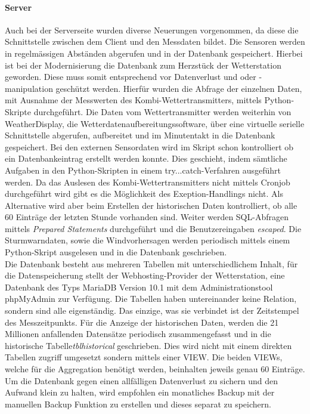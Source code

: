\documentclass[10pt]{article}
\begin{document}
\begin{multicols}{2}
\paragraph{Server}
Auch bei der  Serverseite wurden diverse Neuerungen vorgenommen, da diese die Schnittstelle zwischen dem Client und den Messdaten bildet. Die Sensoren werden in regelmässigen Abständen abgerufen und in der Datenbank gespeichert. Hierbei ist bei der Modernisierung die Datenbank zum Herzstück der Wetterstation geworden. Diese muss somit entsprechend vor Datenverlust und oder -manipulation geschützt werden. Hierfür wurden die Abfrage der einzelnen Daten, mit Ausnahme der Messwerten des Kombi-Wettertransmitters, mittels Python-Skripte durchgeführt. Die Daten vom Wettertransmitter werden weiterhin von WeatherDisplay, die Wetterdatenaufbereitungssoftware, über eine virtuelle serielle Schnittstelle abgerufen, aufbereitet und im Minutentakt in die Datenbank gespeichert. Bei den externen Sensordaten wird im Skript schon kontrolliert ob ein Datenbankeintrag erstellt werden konnte. Dies geschieht, indem sämtliche Aufgaben in den Python-Skripten in einem try...catch-Verfahren ausgeführt werden. Da das Auslesen des Kombi-Wettertransmitters nicht mittels Cronjob durchgeführt wird gibt es die Möglichkeit des Exeption-Handlings nicht. Als Alternative wird aber beim Erstellen der historischen Daten kontrolliert, ob alle 60 Einträge der letzten Stunde vorhanden sind. Weiter werden SQL-Abfragen mittels \emph{Prepared Statements} durchgeführt und die Benutzereingaben \emph{escaped}. Die Sturmwarndaten, sowie die Windvorhersagen werden periodisch mittels einem Python-Skript ausgelesen und in die Datenbank geschrieben.\\
Die Datenbank besteht aus mehreren Tabellen mit unterschiedlichem Inhalt, für die Datenspeicherung stellt der Webhosting-Provider der Wetterstation, eine Datenbank des Typs MariaDB Version 10.1 mit dem Administrationstool phpMyAdmin zur Verfügung. Die Tabellen haben untereinander keine Relation, sondern sind alle eigenständig. Das einzige, was sie verbindet ist der Zeitstempel des Messzeitpunkts. Für die Anzeige der historischen Daten, werden die 21 Millionen anfallenden Datensätze periodisch zusammengefasst und in die  historische Tabelle\emph{tblhistorical} geschrieben. Dies wird nicht mit einem direkten Tabellen zugriff umgesetzt sondern mittels einer VIEW. Die beiden VIEWs, welche für die Aggregation benötigt werden, beinhalten jeweils genau 60 Einträge.\\
Um die Datenbank gegen einen allfälligen Datenverlust zu sichern und den Aufwand klein zu halten, wird empfohlen ein monatliches Backup mit der manuellen Backup Funktion zu erstellen und dieses separat zu speichern.

\end{multicols}
\end{document}

